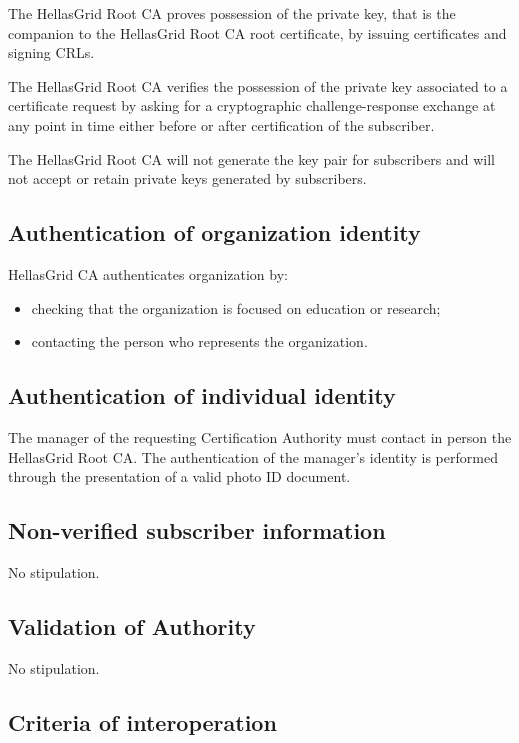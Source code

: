 \documentclass[11pt,a4paper,titlepage]{book}
\begin{document}
The HellasGrid Root CA proves possession of the private key, that is the companion to the HellasGrid Root CA root certificate, by issuing certificates and signing CRLs.

The HellasGrid Root CA verifies the possession of the private key associated to a certificate request by asking for a cryptographic challenge-response exchange at any point in time either before or after certification of the subscriber.

The HellasGrid Root CA will not generate the key pair for subscribers and will not accept or retain private keys generated by subscribers.

\subsection{Authentication of organization identity}

HellasGrid CA authenticates organization by:

\begin{itemize}
\item{checking that the organization is focused on education or research;}
\item{contacting the person who represents the organization.}
\end{itemize}

\subsection{Authentication of individual identity}

The manager of the requesting Certification Authority must contact in person the HellasGrid Root CA. The authentication of the manager's identity is performed through the presentation of a valid photo ID document.

\subsection{Non-verified subscriber information}

No stipulation.

\subsection{Validation of Authority}

No stipulation.

\subsection{Criteria of interoperation}
\end{document}
